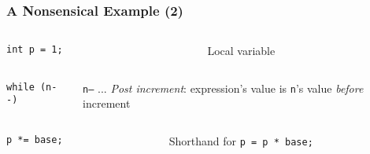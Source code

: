 \begin{frame}[fragile]
  \frametitle{A Nonsensical Example (2)}

  \begin{block}{}
    \begin{columns}[c]
      \begin{column}{.5\textwidth}
        \begin{block}{}
\begin{verbatim}
int p = 1;
\end{verbatim}
        \end{block}
      \end{column}
      \begin{column}{.4\textwidth}
        Local variable
      \end{column}
    \end{columns}
  \end{block}

  \begin{block}{}
    \begin{columns}[c]
      \begin{column}{.5\textwidth}
        \begin{block}{}
\begin{verbatim}
while (n--)
\end{verbatim}
        \end{block}
      \end{column}
      \begin{column}{.4\textwidth}
        \texttt{n--} ... \textit{Post increment}: expression's value
        is \texttt{n}'s value \textit{before} increment
      \end{column}
    \end{columns}
  \end{block}

  \begin{block}{}
    \begin{columns}[c]
      \begin{column}{.5\textwidth}
        \begin{block}{}
\begin{verbatim}
p *= base;
\end{verbatim}
        \end{block}
      \end{column}
      \begin{column}{.4\textwidth}
        Shorthand for \texttt{p = p * base;}
      \end{column}
    \end{columns}
  \end{block}


\end{frame}
